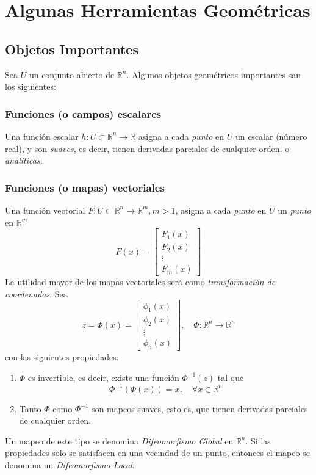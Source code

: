 \chapter{Algunas Herramientas Geométricas}
\section{Objetos Importantes}
Sea $U$ un conjunto abierto de $\mathbb{R}^n$. Algunos objetos geométricos importantes san los siguientes:
\subsection{Funciones (o campos) escalares}
Una función escalar $h:U \subset \mathbb{R}^n \rightarrow \mathbb{R}$ asigna a cada \textit{punto} en $U$ un escalar (número real), y son \textit{suaves}, es decir, tienen derivadas parciales de cualquier orden, o \textit{analíticas}.

\subsection{Funciones (o mapas) vectoriales}
Una función vectorial $F: U \subset \mathbb{R}^n \rightarrow \mathbb{R}^m, m >1$, asigna a cada \textit{punto} en $U$ un \textit{punto} en $\mathbb{R}^m$
\begin{equation*}
	F(x) = \begin{bmatrix}
		F_1(x) \\
		F_2(x) \\
		\vdots \\
		F_m(x)
	\end{bmatrix}
\end{equation*}
La utilidad mayor de los mapas vectoriales será como \textit{transformación de coordenadas}. Sea
\begin{equation*}
	z = \Phi(x) = \begin{bmatrix}
		\phi_1(x) \\
		\phi_2(x) \\
		\vdots    \\
		\phi_n(x)
	\end{bmatrix}, \quad \Phi: \mathbb{R}^n \rightarrow \mathbb{R}^n
\end{equation*}
con las siguientes propiedades:
\begin{enumerate}
	\item $\Phi$ es invertible, es decir, existe una función $\Phi^{-1}(z)$ tal que
	      \begin{equation*}
		      \Phi^{-1}(\Phi(x)) = x, \quad \forall x \in \mathbb{R}^n
	      \end{equation*}
	\item Tanto $\Phi$ como $\Phi^{-1}$ son mapeos suaves, esto es, que tienen derivadas parciales de cualquier orden.
\end{enumerate}
Un mapeo de este tipo se denomina \textit{Difeomorfismo Global} en $\mathbb{R}^n$. Si las propiedades solo se satisfacen en una vecindad de un punto, entonces el mapeo se denomina un \textit{Difeomorfismo Local}.

